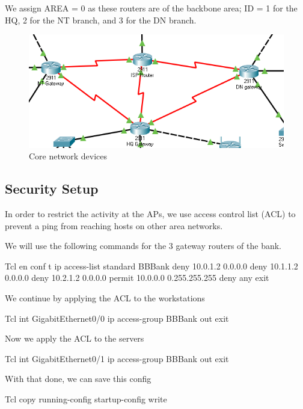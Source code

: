 We assign AREA = 0 as these routers are of the backbone area; ID = 1 for the HQ, 2 for the NT branch, and 3 for the DN branch.

\begin{figure}
    \centering
    \includegraphics{./assets/core.png}
    \caption{Core network devices}
\end{figure}

\subsection{Security Setup}
In order to restrict the activity at the APs, we use access control list (ACL) to prevent a ping from reaching hosts on other area networks.

We will use the following commands for the 3 gateway routers of the bank.

\begin{code}{Tcl}
  en
  conf t
  ip access-list standard BBBank
  deny 10.0.1.2 0.0.0.0
  deny 10.1.1.2 0.0.0.0
  deny 10.2.1.2 0.0.0.0
  permit 10.0.0.0 0.255.255.255
  deny any
  exit
\end{code}

We continue by applying the ACL to the workstations

\begin{code}{Tcl}
  int GigabitEthernet0/0
  ip access-group BBBank out
  exit
\end{code}

Now we apply the ACL to the servers

\begin{code}{Tcl}
  int GigabitEthernet0/1
  ip access-group BBBank out
  exit
\end{code}

With that done, we can save this config

\begin{code}{Tcl}
  copy running-config startup-config
  write
\end{code}

